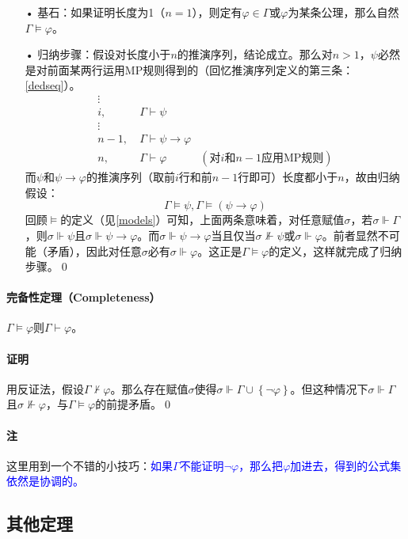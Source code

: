 \documentclass[b5paper,oneside]{ctexbook}
\newcommand{\Blue}[1]{\textcolor[named]{blue}{#1}}
\begin{document}
\begin{enumerate}
\item[•]基石：如果证明长度为1（$n = 1$），则定有$\varphi\in\Gamma$或$\varphi$为某条公理，那么自然$\Gamma \models \varphi$。
\item[•]归纳步骤：假设对长度小于$n$的推演序列，结论成立。那么对$n>1$，$\psi$必然是对前面某两行运用MP规则得到的（回忆推演序列定义的第三条：\ref{dedseq}）。
\begin{align*}
\vdots\ &\ 
\\i,\ &\Gamma\vdash\psi
\\\vdots\ &\ 
\\n-1,\ &\Gamma\vdash\psi\rightarrow \varphi
\\n,\ &\Gamma\vdash\varphi\quad\quad\quad (\text{对}i\text{和}n-1\text{应用MP规则})
\end{align*}
而$\psi$和$\psi\to\varphi$的推演序列（取前$i$行和前$n-1$行即可）长度都小于$n$，故由归纳假设：
\[\Gamma\models\psi, \Gamma\models (\psi\to\varphi )\]
回顾$\models$的定义（见\ref{models}）可知，上面两条意味着，对任意赋值$\sigma$，若$\sigma\Vdash\Gamma$，则$\sigma\Vdash\psi$且$\sigma\Vdash\psi\to\varphi$。而$\sigma\Vdash\psi\to\varphi$当且仅当$\sigma\not\Vdash\psi$或$\sigma\Vdash\varphi$。前者显然不可能（矛盾），因此对任意$\sigma$必有$\sigma\Vdash\varphi$。这正是$\Gamma\models\varphi$的定义，这样就完成了归纳步骤。\hfill\qed
\end{enumerate}

\paragraph{完备性定理（Completeness）}$\Gamma\models\varphi$则$\Gamma\vdash\varphi$。
\paragraph{证明}用反证法，假设$\Gamma\not\vdash \varphi$。那么存在赋值$\sigma$使得$\sigma \Vdash\Gamma\cup\left\lbrace \neg\varphi\right\rbrace$。但这种情况下$\sigma \Vdash \Gamma$且$\sigma\not\Vdash\varphi$，与$\Gamma\models\varphi$的前提矛盾。\hfill\qed

\paragraph{注}这里用到一个不错的小技巧：\Blue{如果$\Gamma$不能证明$\neg\varphi$，那么把$\varphi$加进去，得到的公式集依然是协调的。}
\subsection{其他定理}
\end{document}
